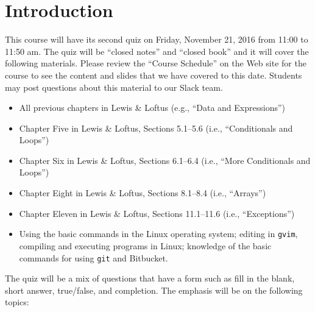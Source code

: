 


\vspace*{-.2in}
\section*{Introduction}
\vspace*{-.05in}

This course will have its second quiz on Friday, November 21, 2016 from 11:00 to 11:50 am. The quiz will be ``closed
notes'' and ``closed book'' and it will cover the following materials. Please review the ``Course Schedule'' on the Web
site for the course to see the content and slides that we have covered to this date. Students may post questions about
this material to our Slack team.

\begin{itemize}

  \itemsep -.01in

  \item All previous chapters in Lewis \& Loftus (e.g., ``Data and Expressions'')

  \item Chapter Five in Lewis \& Loftus, Sections 5.1--5.6 (i.e., ``Conditionals and Loops'')

  \item Chapter Six in Lewis \& Loftus, Sections 6.1--6.4 (i.e., ``More Conditionals and Loops'')

  \item Chapter Eight in Lewis \& Loftus, Sections 8.1--8.4 (i.e., ``Arrays'')

  \item Chapter Eleven in Lewis \& Loftus, Sections 11.1--11.6 (i.e., ``Exceptions'')

  \item Using the basic commands in the Linux operating system; editing in {\tt gvim}, compiling and executing
    programs in Linux; knowledge of the basic commands for using {\tt git} and Bitbucket.

\end{itemize}

\vspace*{-.05in}
\noindent The quiz will be a mix of questions that have a form such as fill in the blank, short answer, true/false, and
completion.  The emphasis will be on the following topics:


